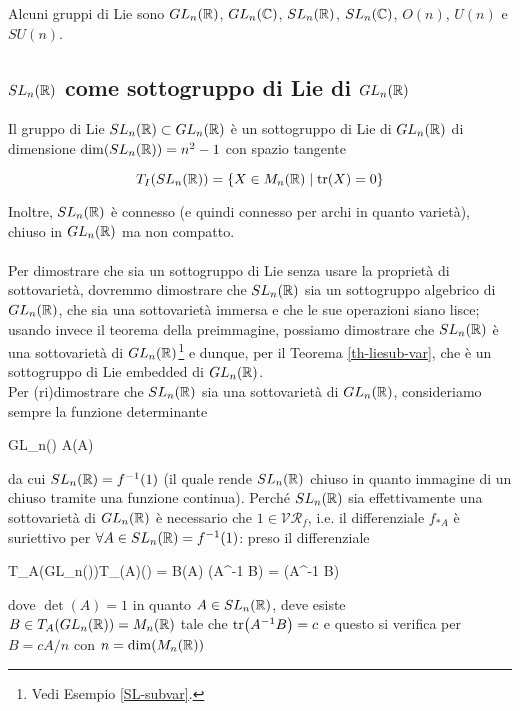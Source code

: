 Alcuni gruppi di Lie sono $ GL_{n}(\mathbb{R}) $, $ GL_{n}(\mathbb{C}) $, $ SL_{n}(\mathbb{R}) $, $ SL_{n}(\mathbb{C}) $, $ O(n) $, $ U(n) $ e $ SU(n) $.

\subsection{$ SL_{n}(\mathbb{R}) $ come sottogruppo di Lie di $ GL_{n}(\mathbb{R}) $}\label{SL-sublie}

Il gruppo di Lie $ SL_{n}(\mathbb{R}) \subset GL_{n}(\mathbb{R}) $ è un sottogruppo di Lie di $ GL_{n}(\mathbb{R}) $ di dimensione $ \dim(SL_{n}(\mathbb{R})) = n^{2} - 1 $ con spazio tangente

\begin{equation}
	T_{I}(SL_{n}(\mathbb{R})) = \{ X \in M_{n}(\mathbb{R}) \mid \tr(X) = 0 \}
\end{equation}

Inoltre, $ SL_{n}(\mathbb{R}) $ è connesso (e quindi connesso per archi in quanto varietà), chiuso in $ GL_{n}(\mathbb{R}) $ ma non compatto.\\\\
%
Per dimostrare che sia un sottogruppo di Lie senza usare la proprietà di sottovarietà, dovremmo dimostrare che $ SL_{n}(\mathbb{R}) $ sia un sottogruppo algebrico di $ GL_{n}(\mathbb{R}) $, che sia una sottovarietà immersa e che le sue operazioni siano lisce; usando invece il teorema della preimmagine, possiamo dimostrare che $ SL_{n}(\mathbb{R}) $ è una sottovarietà di $ GL_{n}(\mathbb{R}) $\footnote{%
	Vedi Esempio \ref{SL-subvar}.%
} e dunque, per il Teorema \ref{th-liesub-var}, che è un sottogruppo di Lie embedded di $ GL_{n}(\mathbb{R}) $.\\
Per (ri)dimostrare che $ SL_{n}(\mathbb{R}) $ sia una sottovarietà di $ GL_{n}(\mathbb{R}) $, consideriamo sempre la funzione determinante

%
	{GL_{n}(\R)}{\R}%
	{A}{\det(A)}
	
da cui $ SL_{n}(\mathbb{R}) = f^{-1}(1) $ (il quale rende $ SL_{n}(\mathbb{R}) $ chiuso in quanto immagine di un chiuso tramite una funzione continua). Perché $ SL_{n}(\mathbb{R}) $ sia effettivamente una sottovarietà di $ GL_{n}(\mathbb{R}) $ è necessario che $ 1 \in \mathcal{VR}_{f} $, i.e. il differenziale $ f_{*A} $ è suriettivo per $ \forall A \in SL_{n}(\mathbb{R}) = f^{-1}(1) $: preso il differenziale

%
	{T_{A}(GL_{n}(\R))}{T_{\det(A)}(\R) = \R}%
	{B}{\det(A) \tr(A^{-1} B) = \tr(A^{-1} B)}

dove $ \det(A) = 1 $ in quanto $ A \in SL_{n}(\mathbb{R}) $, deve esiste $ B \in T_{A}(GL_{n}(\mathbb{R})) = M_{n}(\mathbb{R}) $ tale che $ \tr(A^{-1} B) = c $ e questo si verifica per $ B = c A / n $ con $ n = \dim(M_{n}(\mathbb{R})) $

